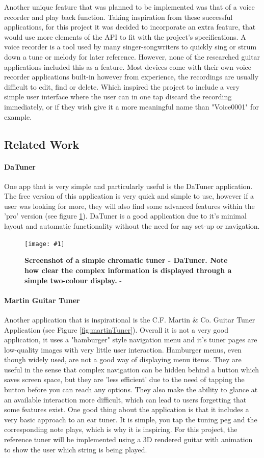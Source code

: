 \documentclass[conference]{acmsiggraph}
\newcommand{\figuremacroW}[4]{
	\begin{figure}[H] %
		\centering
		\texttt{[image: \#1]}
		\caption[#2]{\textbf{#2} - #3}
		\label{fig:#1}
	\end{figure}
}
\begin{document}
Another unique feature that was planned to be implemented was that of a voice recorder and play back function. Taking inspiration from these successful applications, for this project it was decided to incorporate an extra feature, that would use more elements of the API to fit with the project's specifications. A voice recorder is a tool used by many singer-songwriters to quickly sing or strum down a tune or melody for later reference. However, none of the researched guitar applications included this as a feature. Most devices come with their own voice recorder applications built-in however from experience, the recordings are usually difficult to edit, find or delete. Which inspired the project to include a very simple user interface where the user can in one tap discard the recording immediately, or if they wish give it a more meaningful name than "Voice0001" for example.  

\subsection{Related Work}

\paragraph{DaTuner} One app that is very simple and particularly useful is the DaTuner application. The free version of this application is very quick and simple to use, however if a user was looking for more, they will also find some advanced features within the 'pro' version (see figure \ref{fig:daTune}). DaTuner is a good application due to it's minimal layout and automatic functionality without the need for any set-up or navigation.

\figuremacroW
{daTune}
{Screenshot of a simple chromatic tuner - DaTuner. Note how clear the complex information is displayed through a simple two-colour display.}
{\protect\cite{DaTune}}
{1.0}

\paragraph{Martin Guitar Tuner} Another application that is inspirational is the C.F. Martin \& Co. Guitar Tuner Application (see Figure \ref{fig:martinTuner}). Overall it is not a very good application, it uses a "hamburger" style navigation menu and it's tuner pages are low-quality images with very little user interaction. Hamburger menus, even though widely used, are not a good way of displaying menu items. They are useful in the sense that complex navigation can be hidden behind a button which saves screen space, but they are 'less efficient' due to the need of tapping the button before you can reach any options. They also make the ability to glance at an available interaction more difficult, which can lead to users forgetting that some features exist. \cite{hamburger} One good thing about the application is that it includes a very basic approach to an ear tuner. It is simple, you tap the tuning peg and the corresponding note plays, which is why it is inspiring. For this project, the reference tuner will be implemented using a 3D rendered guitar with animation to show the user which string is being played.
\end{document}
